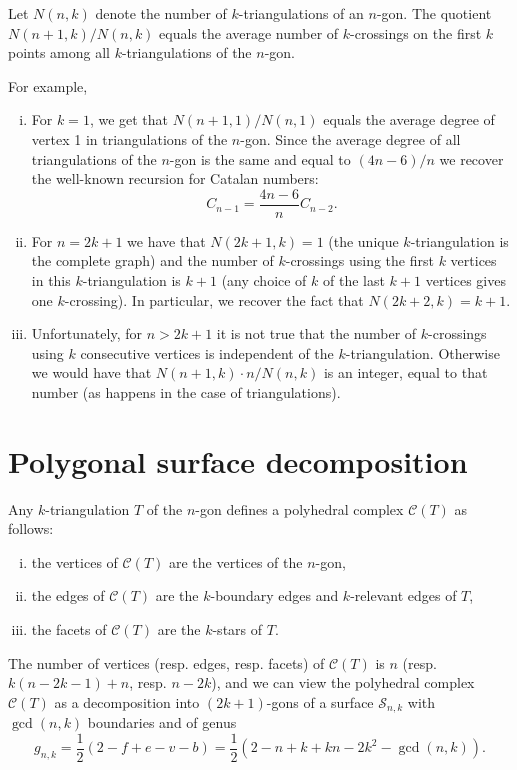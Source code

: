 \documentclass[12pt]{amsart}
\begin{document}
\begin{corollary}
Let $N(n,k)$ denote the number of $k$-triangulations of an $n$-gon. The quotient $N(n+1,k)/N(n,k)$ equals the average number of $k$-crossings on the first $k$ points among all $k$-triangulations of the $n$-gon.
\end{corollary}

\begin{remark}
For example,
\begin{enumerate}[(i)]
\item For $k=1$, we get that $N(n+1,1)/N(n,1)$ equals the average degree of vertex 1 in triangulations of the $n$-gon. Since the average degree of all triangulations of the $n$-gon is the same and equal to $(4n-6)/n$ we recover the well-known recursion for Catalan numbers:
\[
C_{n-1}=\frac{4n-6}{n}C_{n-2}.
\]

\item For $n=2k+1$ we have that $N(2k+1,k)=1$ (the unique $k$-triangulation is the complete graph)
and the number of $k$-crossings using the first $k$ vertices in this $k$-triangulation is $k+1$ (any choice of $k$ of the last $k+1$ vertices gives one $k$-crossing). In particular, we recover the fact that $N(2k+2,k)=k+1$.

\item Unfortunately, for $n>2k+1$ it is not true that the number of $k$-crossings using $k$ consecutive vertices is independent of the $k$-triangulation. Otherwise we would have that  $N(n+1,k)\cdot n /N(n,k)$ is an integer, equal to that number (as happens in the case of triangulations).
\end{enumerate}
\end{remark}





\section{Polygonal surface decomposition}\label{sectionsurfaces}

Any $k$-triangulation $T$ of the $n$-gon defines a polyhedral complex $\mathcal{C}(T)$ as follows:
\begin{enumerate}[(i)]
\item the vertices of $\mathcal{C}(T)$ are the vertices of the $n$-gon,
\item the edges of $\mathcal{C}(T)$ are the $k$-boundary edges and $k$-relevant edges of $T$,
\item the facets of $\mathcal{C}(T)$ are the $k$-stars of $T$.
\end{enumerate}
The number of vertices (resp. edges, resp. facets) of $\mathcal{C}(T)$ is $n$ (resp. $k(n-2k-1)+n$, resp. $n-2k$), and we can view the polyhedral complex $\mathcal{C}(T)$ as a decomposition into $(2k+1)$-gons of a surface $\mathcal{S}_{n,k}$ with $\gcd(n,k)$ boundaries and of genus
$$g_{n,k}=\frac{1}{2}(2-f+e-v-b)=\frac{1}{2}(2-n+k+kn-2k^2-\gcd(n,k)).$$
\end{document}
